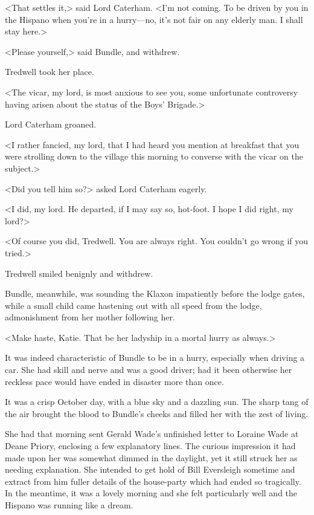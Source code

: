 <That settles it,> said Lord Caterham. <I'm not coming. To be driven by you in the Hispano when you're in a hurry—no, it's not fair on any elderly man. I shall stay here.>

<Please yourself,> said Bundle, and withdrew.

Tredwell took her place.

<The vicar, my lord, is most anxious to see you, some unfortunate controversy having arisen about the status of the Boys' Brigade.>

Lord Caterham groaned.

<I rather fancied, my lord, that I had heard you mention at breakfast that you were strolling down to the village this morning to converse with the vicar on the subject.>

<Did you tell him so?> asked Lord Caterham eagerly.

<I did, my lord. He departed, if I may say so, hot-foot. I hope I did right, my lord?>

<Of course you did, Tredwell. You are always right. You couldn't go wrong if you tried.>

Tredwell smiled benignly and withdrew.

Bundle, meanwhile, was sounding the Klaxon impatiently before the lodge gates, while a small child came hastening out with all speed from the lodge, admonishment from her mother following her.

<Make haste, Katie. That be her ladyship in a mortal hurry as always.>

It was indeed characteristic of Bundle to be in a hurry, especially when driving a car. She had skill and nerve and was a good driver; had it been otherwise her reckless pace would have ended in disaster more than once.

It was a crisp October day, with a blue sky and a dazzling sun. The sharp tang of the air brought the blood to Bundle's cheeks and filled her with the zest of living.

She had that morning sent Gerald Wade's unfinished letter to Loraine Wade at Deane Priory, enclosing a few explanatory lines. The curious impression it had made upon her was somewhat dimmed in the daylight, yet it still struck her as needing explanation. She intended to get hold of Bill Eversleigh sometime and extract from him fuller details of the house-party which had ended so tragically. In the meantime, it was a lovely morning and she felt particularly well and the Hispano was running like a dream.

